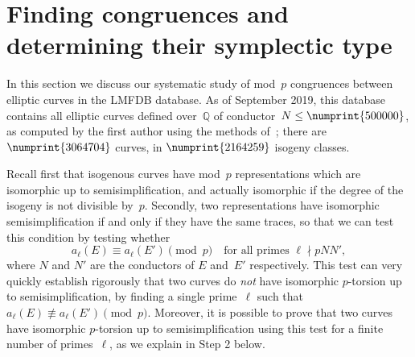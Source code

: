 \documentclass[12pt, reqno]{amsart}
\newcommand{\Q}{\mathbb{Q}}
\numberwithin{equation}{section}
\theoremstyle{definition}
\theoremstyle{remark}
\begin{document}
\section{Finding congruences and determining their symplectic type}\label{S:statistics}

In this section we discuss our systematic study of mod~$p$ congruences
between elliptic curves in the LMFDB database.  As of September 2019, this
database contains all elliptic curves defined over~$\Q$ of
conductor~$N\le\numprint{500000}$, as computed by the first author
using the methods of~\cite{AMEC}; there are $\numprint{3064704}$
curves, in $\numprint{2164259}$ isogeny classes.


Recall first that isogenous curves have mod~$p$ representations which
are isomorphic up to semisimplification, and actually isomorphic if
the degree of the isogeny is not divisible by~$p$.  Secondly, two
representations have isomorphic semisimplification if and only if they
have the same traces, so that we can test this condition by testing
whether
\[ a_{\ell}(E)\equiv a_{\ell}(E')\pmod{p}
\quad \text{for all primes } \ell \nmid pNN',
\] 
where $N$ and $N'$ are the conductors of $E$
and~$E'$ respectively.  This test can very quickly establish rigorously
that two curves do \emph{not} have isomorphic $p$-torsion up to
semisimplification, by finding  a single
prime~$\ell$ such that $a_{\ell}(E)\not\equiv a_{\ell}(E')\pmod{p}$.
Moreover, it is possible to prove that two curves have isomorphic $p$-torsion up to
semisimplification using this test for a finite number of
primes~$\ell$, as we explain in Step 2 below.
\end{document}
